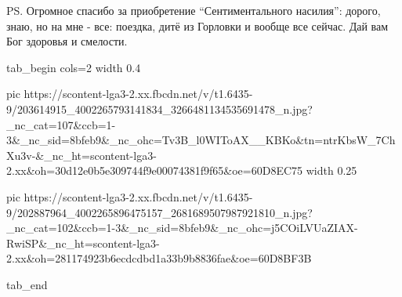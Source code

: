 PS. Огромное спасибо за приобретение \enquote{Сентиментального насилия}: дорого, знаю,
но на мне - все: поездка, дитё из Горловки и вообще все сейчас. Дай вам Бог
здоровья и смелости.

\ifcmt
  tab_begin cols=2
    width 0.4

     pic https://scontent-lga3-2.xx.fbcdn.net/v/t1.6435-9/203614915_4002265793141834_3266481134535691478_n.jpg?_nc_cat=107&ccb=1-3&_nc_sid=8bfeb9&_nc_ohc=Tv3B_l0WIToAX__KBKo&tn=ntrKbsW_7ChXu3v-&_nc_ht=scontent-lga3-2.xx&oh=30d12e0b5e309744f9e00074381f9f65&oe=60D8EC75
     width 0.25

     pic https://scontent-lga3-2.xx.fbcdn.net/v/t1.6435-9/202887964_4002265896475157_2681689507987921810_n.jpg?_nc_cat=102&ccb=1-3&_nc_sid=8bfeb9&_nc_ohc=j5COiLVUaZIAX-RwiSP&_nc_ht=scontent-lga3-2.xx&oh=281174923b6ecdcdbd1a33b9b8836fae&oe=60D8BF3B

  tab_end
\fi




